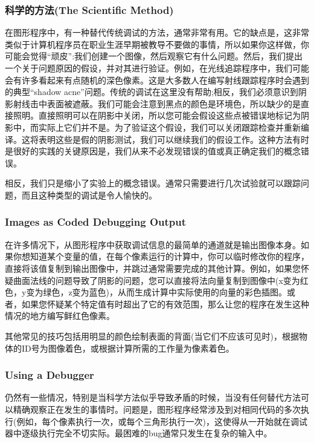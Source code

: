 \subsubsection*{\textcolor{structure3}{科学的方法(The Scientific Method)}}

在图形程序中，有一种替代传统调试的方法，通常非常有用。它的缺点是，这非常类似于计算机程序员在职业生涯早期被教导不要做的事情，所以如果你这样做，你可能会觉得“顽皮”:我们创建一个图像，然后观察它有什么问题。然后，我们提出一个关于问题原因的假设，并对其进行验证。例如，在光线追踪程序中，我们可能会有许多看起来有点随机的深色像素。这是大多数人在编写射线跟踪程序时会遇到的典型“shadow acne”问题。传统的调试在这里没有帮助;相反，我们必须意识到阴影射线击中表面被遮蔽。我们可能会注意到黑点的颜色是环境色，所以缺少的是直接照明。直接照明可以在阴影中关闭，所以您可能会假设这些点被错误地标记为阴影中，而实际上它们并不是。为了验证这个假设，我们可以关闭跟踪检查并重新编译。这将表明这些是假的阴影测试，我们可以继续我们的假设工作。这种方法有时是很好的实践的关键原因是，我们从来不必发现错误的值或真正确定我们的概念错误。

相反，我们只是缩小了实验上的概念错误。通常只需要进行几次试验就可以跟踪问题，而且这种类型的调试是令人愉快的。

\subsubsection*{\textcolor{structure3}{Images as Coded Debugging Output}}
在许多情况下，从图形程序中获取调试信息的最简单的通道就是输出图像本身。如果你想知道某个变量的值，在每个像素运行的计算中，你可以临时修改你的程序，直接将该值复制到输出图像中，并跳过通常需要完成的其他计算。例如，如果您怀疑曲面法线的问题导致了阴影的问题，您可以直接将法向量复制到图像中(x变为红色，y变为绿色，z变为蓝色)，从而生成计算中实际使用的向量的彩色插图。或者，如果您怀疑某个特定值有时超出了它的有效范围，那么让您的程序在发生这种情况的地方编写鲜红色像素。

其他常见的技巧包括用明显的颜色绘制表面的背面(当它们不应该可见时)，根据物体的ID号为图像着色，或根据计算所需的工作量为像素着色。

\subsubsection*{\textcolor{structure3}{Using a Debugger}}

仍然有一些情况，特别是当科学方法似乎导致矛盾的时候，当没有任何替代方法可以精确观察正在发生的事情时。问题是，图形程序经常涉及到对相同代码的多次执行(例如，每个像素执行一次，或每个三角形执行一次)，这使得从一开始就在调试器中逐级执行完全不切实际。最困难的bug通常只发生在复杂的输入中。


